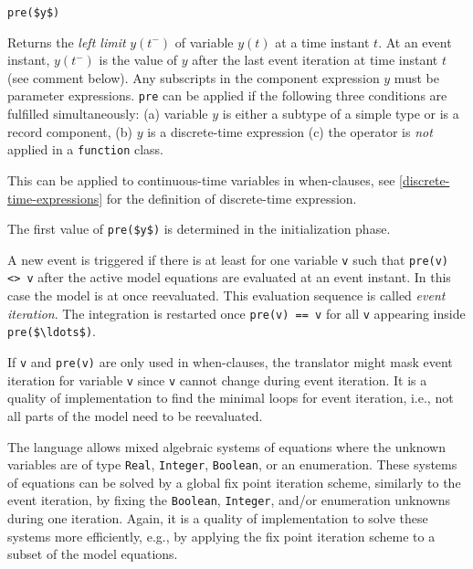 \begin{operatordefinition}[pre]
\begin{synopsis}\begin{lstlisting}
pre($y$)
\end{lstlisting}\end{synopsis}
\begin{semantics}
Returns the \emph{left limit} $y(t^{-})$ of variable $y(t)$ at a time instant $t$.
At an event instant, $y(t^{-})$ is the value of $y$ after the last event iteration at time instant $t$ (see comment below).
Any subscripts in the component expression $y$ must be parameter expressions.
\lstinline!pre! can be applied if the following three conditions are fulfilled simultaneously: (a) variable $y$ is either a subtype of a simple type or is a record component, (b) $y$ is a discrete-time expression (c) the operator is \emph{not} applied in a \lstinline!function! class.
\begin{nonnormative}
This can be applied to continuous-time variables in when-clauses, see \cref{discrete-time-expressions} for the definition of discrete-time expression.
\end{nonnormative}
The first value of \lstinline!pre($y$)! is determined in the initialization phase.

A new event is triggered if there is at least for one variable \lstinline!v! such that \lstinline!pre(v) <> v! after the active model equations are evaluated at an event instant.  In this case the model is at once reevaluated.  This evaluation sequence is called \emph{event iteration}.  The integration is restarted once \lstinline!pre(v) == v! for all \lstinline!v! appearing inside \lstinline!pre($\ldots$)!.

\begin{nonnormative}
If \lstinline!v! and \lstinline!pre(v)! are only used in when-clauses, the translator might mask event iteration for variable \lstinline!v! since \lstinline!v! cannot change during event iteration.
It is a quality of implementation to find the minimal loops for event iteration, i.e., not all parts of the model need to be reevaluated.

The language allows mixed algebraic systems of equations where the unknown variables are of type \lstinline!Real!, \lstinline!Integer!, \lstinline!Boolean!, or an enumeration.
These systems of equations can be solved by a global fix point iteration scheme, similarly to the event iteration, by fixing the \lstinline!Boolean!, \lstinline!Integer!, and/or enumeration unknowns during one iteration.
Again, it is a quality of implementation to solve these systems more efficiently, e.g., by applying the fix point iteration scheme to a subset of the model equations.
\end{nonnormative}
\end{semantics}
\end{operatordefinition}

